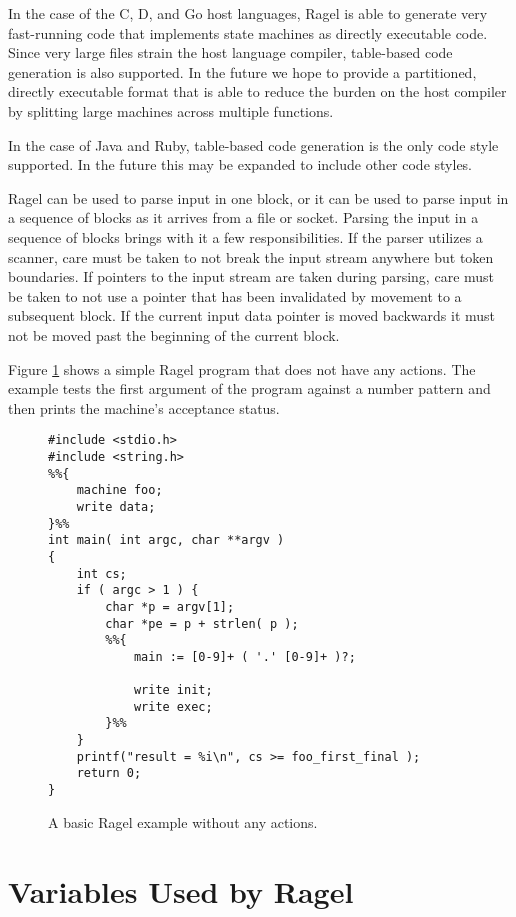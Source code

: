 \documentclass[letterpaper,11pt,oneside]{book}
\begin{document}
In the case of the C, D, and Go host languages, Ragel is able to generate very
fast-running code that implements state machines as directly executable code.
Since very large files strain the host language compiler, table-based code
generation is also supported. In the future we hope to provide a partitioned,
directly executable format that is able to reduce the burden on the host
compiler by splitting large machines across multiple functions.

In the case of Java and Ruby, table-based code generation is the only code
style supported. In the future this may be expanded to include other code
styles.

Ragel can be used to parse input in one block, or it can be used to parse input
in a sequence of blocks as it arrives from a file or socket.  Parsing the input
in a sequence of blocks brings with it a few responsibilities. If the parser
utilizes a scanner, care must be taken to not break the input stream anywhere
but token boundaries.  If pointers to the input stream are taken during
parsing, care must be taken to not use a pointer that has been invalidated by
movement to a subsequent block.  If the current input data pointer is moved
backwards it must not be moved past the beginning of the current block.

Figure \ref{basic-example} shows a simple Ragel program that does not have any
actions. The example tests the first argument of the program against a number
pattern and then prints the machine's acceptance status.

\begin{figure}
\small
\begin{verbatim}
#include <stdio.h>
#include <string.h>
%%{
    machine foo;
    write data;
}%%
int main( int argc, char **argv )
{
    int cs;
    if ( argc > 1 ) {
        char *p = argv[1];
        char *pe = p + strlen( p );
        %%{ 
            main := [0-9]+ ( '.' [0-9]+ )?;

            write init;
            write exec;
        }%%
    }
    printf("result = %i\n", cs >= foo_first_final );
    return 0;
}
\end{verbatim}
\caption{A basic Ragel example without any actions.}
\label{basic-example}
\end{figure}

\section{Variables Used by Ragel}
\end{document}
